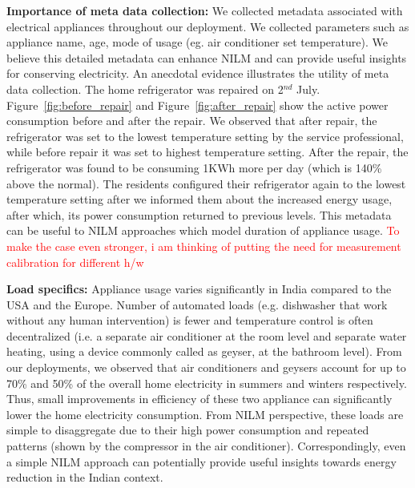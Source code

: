 \documentclass[10pt]{sensys-proc}
\newcommand{\redcolor}[1]{\textcolor{red}{#1}}
\newcommand{\figref}[1]{Figure~\ref{#1}}
\begin{document}
\noindent \textbf{Importance of meta data collection:} We collected metadata associated with electrical appliances throughout our deployment. We collected parameters such as appliance name, age, mode of usage (eg. air conditioner set temperature). We believe this detailed metadata can enhance NILM and can provide useful insights for conserving electricity. An anecdotal evidence illustrates the utility of meta data collection. The home refrigerator was repaired on 2$^{nd}$ July. \figref{fig:before_repair} and \figref{fig:after_repair} show the active power consumption before and after the repair. We observed that after repair, the refrigerator was set to the lowest temperature setting by the service professional, while before repair it was set to highest temperature setting. After the repair, the refrigerator was found to be consuming 1KWh more per day (which is 140\% above the normal). The residents configured their refrigerator again to the lowest temperature setting after we informed them about the increased energy usage, after which, its power consumption returned to previous levels. 
This metadata can be useful to NILM approaches which model duration of appliance usage. 
\redcolor{To make the case even stronger, i am thinking of putting the need for measurement calibration for different h/w}

\noindent \textbf{Load specifics:} Appliance usage varies significantly in India compared to the USA and the Europe. Number of automated loads (e.g. dishwasher that work without any human intervention) is fewer and temperature control is often decentralized (i.e. a separate air conditioner at the room level and separate water heating, using a device commonly called as geyser, at the bathroom level). From our deployments, we observed that air conditioners and geysers account for up to 70\% and 50\% of the overall home electricity in summers and winters respectively. Thus, small improvements in efficiency of these two appliance can significantly lower the home electricity consumption. From NILM perspective, these loads are simple to disaggregate due to their high power consumption and repeated patterns (shown by the compressor in the air conditioner). Correspondingly, even a simple NILM approach can potentially provide useful insights towards energy reduction in the Indian context.
\end{document}
